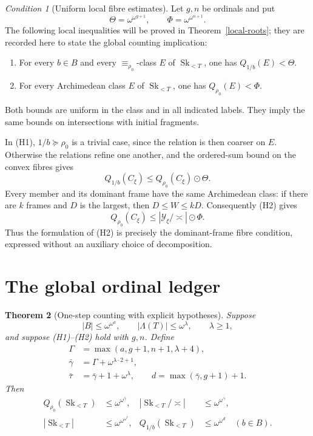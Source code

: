 \documentclass[11pt]{article}
\newtheorem{theorem}{Theorem}[section]
\theoremstyle{definition}
\theoremstyle{remark}
\newcommand{\Sk}{\operatorname{Sk}}
\newcommand{\arch}{\mathrel{\asymp}}
\newcommand{\od}{\mathbin{\odot}}
\newcommand{\Lam}{\Lambda}
\newcommand{\Ycal}{\mathcal Y}
\newtheorem{hypothesis}[theorem]{Condition}
\numberwithin{equation}{section}
\begin{document}
\begin{hypothesis}[Uniform local fibre estimates]\label{g-hyp:fibres}
Let $g,n$ be ordinals and put
\[
 \Theta=\omega^{\omega^{g+1}},\qquad
 \Phi=\omega^{\omega^{n+1}}.
\]
The following local inequalities will be proved in
Theorem~\ref{local-roots}; they are recorded here to state the
global counting implication:
\begin{enumerate}[label=\textup{(H\arabic*)},leftmargin=3.5em]
\item For every $b\in B$ and every $\equiv_{\rho_0}$-class
$E$ of $\Sk_{<T}$, one has $Q_{1/b}(E)<\Theta$.
\item For every Archimedean class $E$ of $\Sk_{<T}$,
one has $Q_{\rho_0}(E)<\Phi$.
\end{enumerate}
Both bounds are uniform in the class and in all indicated labels.
They imply the same bounds on intersections with initial fragments.
\end{hypothesis}

In (H1), $1/b\succeq\rho_0$ is a trivial case, since the relation is
then coarser on $E$.  Otherwise the relations refine one another, and
the ordered-sum bound on the convex fibres gives
\begin{equation}
 Q_{1/b}(C_\xi)\le Q_{\rho_0}(C_\xi)\od\Theta.
 \label{g-eq-3.2}
\end{equation}
Every member and its dominant frame have the same Archimedean class:
if there are $k$ frames and $D$ is the largest, then
$D\le W\le kD$.  Consequently (H2) gives
\begin{equation}
 Q_{\rho_0}(C_\xi)\le |\Ycal_\xi/\arch|\od\Phi.
 \label{g-eq-3.3}
\end{equation}
Thus the formulation of (H2) is precisely the dominant-frame fibre
condition, expressed without an auxiliary choice of decomposition.

\section{The global ordinal ledger}

\begin{theorem}[One-step counting with explicit hypotheses]\label{g-thm:ledger}
Suppose
\[
 |B|\le\omega^{\omega^a},\qquad
 |\Lam(T)|\le\omega^\lambda,\qquad \lambda\ge1,
\]
and suppose (H1)--(H2) hold with $g,n$.  Define
\begin{equation}
 \begin{aligned}
 \Gamma&=\max(a,g+1,n+1,\lambda+4),\\
 \bar\gamma&=\Gamma+\omega^{\lambda\cdot2+1},\\
 \bar\tau&=\bar\gamma+1+\omega^\lambda,\qquad
 d=\max(\bar\gamma,g+1)+1.
 \end{aligned}
\label{g-ledger-parameters}\end{equation}
Then
\[
 \begin{aligned}
 Q_{\rho_0}(\Sk_{<T})&\le\omega^{\omega^{\bar\gamma}},&
 |\Sk_{<T}/\arch|&\le\omega^{\omega^{\bar\gamma}},\\
 |\Sk_{<T}|&\le\omega^{\omega^{\omega^{\bar\tau}}},&
 Q_{1/b}(\Sk_{<T})&\le\omega^{\omega^d}\quad(b\in B).
 \end{aligned}
\]
\end{theorem}
\end{document}

